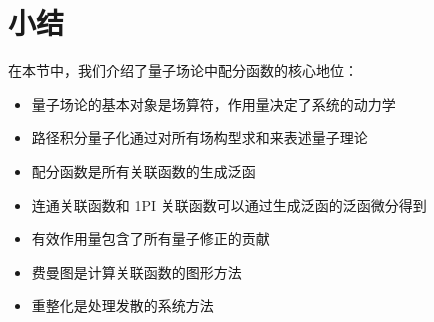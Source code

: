 \section{小结}

在本节中，我们介绍了量子场论中配分函数的核心地位：
\begin{itemize}
    \item 量子场论的基本对象是场算符，作用量决定了系统的动力学
    \item 路径积分量子化通过对所有场构型求和来表述量子理论
    \item 配分函数是所有关联函数的生成泛函
    \item 连通关联函数和 1PI 关联函数可以通过生成泛函的泛函微分得到
    \item 有效作用量包含了所有量子修正的贡献
    \item 费曼图是计算关联函数的图形方法
    \item 重整化是处理发散的系统方法
\end{itemize}

